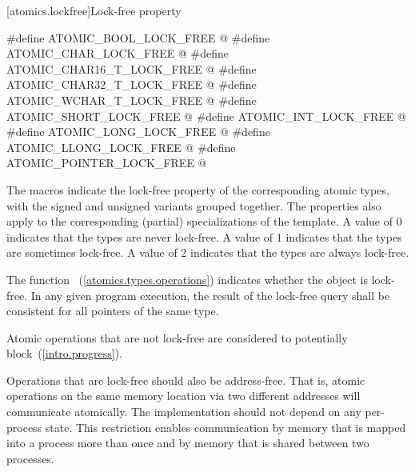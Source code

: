 [atomics.lockfree]{Lock-free property}

%
%
%
%
%
%
%
%
%
%
\begin{codeblock}
#define ATOMIC_BOOL_LOCK_FREE @\unspec@
#define ATOMIC_CHAR_LOCK_FREE @\unspec@
#define ATOMIC_CHAR16_T_LOCK_FREE @\unspec@
#define ATOMIC_CHAR32_T_LOCK_FREE @\unspec@
#define ATOMIC_WCHAR_T_LOCK_FREE @\unspec@
#define ATOMIC_SHORT_LOCK_FREE @\unspec@
#define ATOMIC_INT_LOCK_FREE @\unspec@
#define ATOMIC_LONG_LOCK_FREE @\unspec@
#define ATOMIC_LLONG_LOCK_FREE @\unspec@
#define ATOMIC_POINTER_LOCK_FREE @\unspec@
\end{codeblock}

\pnum
The  macros indicate the lock-free property of the
corresponding atomic types, with the signed and unsigned variants grouped
together. The properties also apply to the corresponding (partial) specializations of the
 template. A value of 0 indicates that the types are never
lock-free. A value of 1 indicates that the types are sometimes lock-free. A
value of 2 indicates that the types are always lock-free.

\pnum
The function ~(\ref{atomics.types.operations})
indicates whether the object is lock-free. In any given program execution, the
result of the lock-free query shall be consistent for all pointers of the same
type.

\pnum
Atomic operations that are not lock-free are considered to potentially
block~(\ref{intro.progress}).

\pnum
\begin{note} Operations that are lock-free should also be address-free. That is,
atomic operations on the same memory location via two different addresses will
communicate atomically. The implementation should not depend on any
per-process state. This restriction enables communication  by memory that is
mapped into a process more than once and by memory that is shared between two
processes. \end{note}

